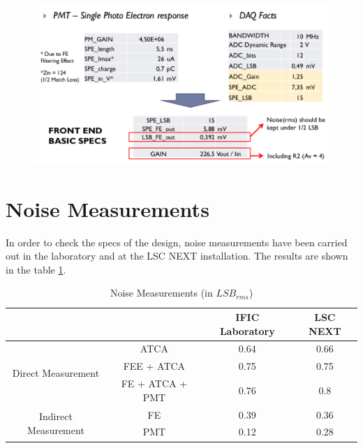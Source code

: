 \documentclass[a4paper,11pt]{report}
\begin{document}
\begin{figure}
  \begin{center}
    \includegraphics[width=\textwidth]{./figures/design_facts.pdf}
    \caption{}
    \label{fig:design_facts}
  \end{center}
\end{figure}
 
  
\section{Noise Measurements}
In order to check the specs of the design, noise measurements have been carried out in the laboratory and at the LSC NEXT installation. The results are shown in the table \ref{tab:noise}. 
  \begin{table}
    \caption{Noise Measurements (in $LSB_{rms}$)}
    \label{tab:noise}
  
    \begin{center}
      \begin{tabular}{ c c || c | c |}
       & & IFIC Laboratory & LSC NEXT \\
       \hline
       \multirow{3}{*}{Direct Measurement} & ATCA & 0.64 & 0.66\\
       & FEE + ATCA & 0.75 & 0.75\\
       & FE + ATCA + PMT & 0.76 & 0.8\\
       \hline
       \multirow{2}{*}{Indirect Measurement} & FE & 0.39 & 0.36\\
       & PMT & 0.12 & 0.28\\
      \end{tabular}
    \end{center}
  \end{table}
\end{document}
